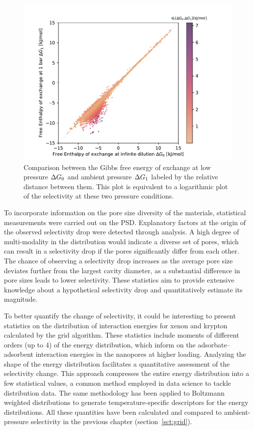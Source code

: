 \documentclass[main]{subfiles}
\begin{document}
\begin{figure}[ht]
\centering
  \includegraphics[width=0.5\linewidth]{figures/4-ml/main/Scatterplot_G1_G0.pdf}
  \caption{Comparison between the Gibbs free energy of exchange at low pressure $\Delta G_{\text{0}}$ and ambient pressure $\Delta G_{\text{1}}$ labeled by the relative distance between them. This plot is equivalent to a logarithmic plot of the selectivity at these two pressure conditions.}
  \label{fgr:problem}
\end{figure}

To incorporate information on the pore size diversity of the materials, statistical measurements were carried out on the PSD. Explanatory factors at the origin of the observed selectivity drop were detected through analysis. A high degree of multi-modality in the distribution would indicate a diverse set of pores, which can result in a selectivity drop if the pores significantly differ from each other. The chance of observing a selectivity drop increases as the average pore size deviates further from the largest cavity diameter, as a substantial difference in pore sizes leads to lower selectivity. These statistics aim to provide extensive knowledge about a hypothetical selectivity drop and quantitatively estimate its magnitude.

To better quantify the change of selectivity, it could be interesting to present statistics on the distribution of interaction energies for xenon and krypton calculated by the grid algorithm. These statistics include moments of different orders (up to 4) of the energy distribution, which inform on the adsorbate--adsorbent interaction energies in the nanopores at higher loading. 
Analyzing the shape of the energy distribution facilitates a quantitative assessment of the selectivity change. This approach compresses the entire energy distribution into a few statistical values, a common method employed in data science to tackle distribution data. The same methodology has been applied to Boltzmann weighted distributions to generate temperature-specific descriptors for the energy distributions. All these quantities have been calculated and compared to ambient-pressure selectivity in the previous chapter (section~\ref{sct:grid}).
\end{document}

